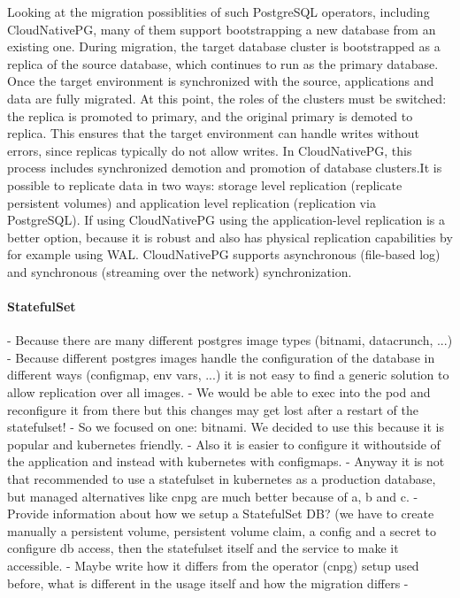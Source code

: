 Looking at the migration possiblities of such PostgreSQL operators, including CloudNativePG, many of them support bootstrapping a new database from an existing one. During migration, the target database cluster is bootstrapped as a replica of the source database, which continues to run as the primary database. Once the target environment is synchronized with the source, applications and data are fully migrated. At this point, the roles of the clusters must be switched: the replica is promoted to primary, and the original primary is demoted to replica. This ensures that the target environment can handle writes without errors, since replicas typically do not allow writes. In CloudNativePG, this process includes synchronized demotion and promotion of database clusters.\footnotemark[\value{footnote}]
It is possible to replicate data in two ways: storage level replication (replicate persistent volumes) and application level replication (replication via PostgreSQL).
If using CloudNativePG using the application-level replication is a better option, because it is robust and also has physical replication capabilities by for example using WAL.
CloudNativePG supports asynchronous (file-based log) and synchronous (streaming over the network) synchronization.

%
\paragraph{StatefulSet}
%
- Because there are many different postgres image types (bitnami, datacrunch, ...)
- Because different postgres images handle the configuration of the database in different ways (configmap, env vars, ...) it is not easy to find a generic solution to allow replication over all images.
- We would be able to exec into the pod and reconfigure it from there but this changes may get lost after a restart of the statefulset!
- So we focused on one: bitnami. We decided to use this because it is popular and kubernetes friendly. 
- Also it is easier to configure it withoutside of the application and instead with kubernetes with configmaps.
- Anyway it is not that recommended to use a statefulset in kubernetes as a production database, but managed alternatives like cnpg are much better because of a, b and c.
- Provide information about how we setup a StatefulSet DB? (we have to create manually a persistent volume, persistent volume claim, a config and a secret to configure db access, then the statefulset itself and the service to make it accessible.
- Maybe write how it differs from the operator (cnpg) setup used before, what is different in the usage itself and how the migration differs
- 

